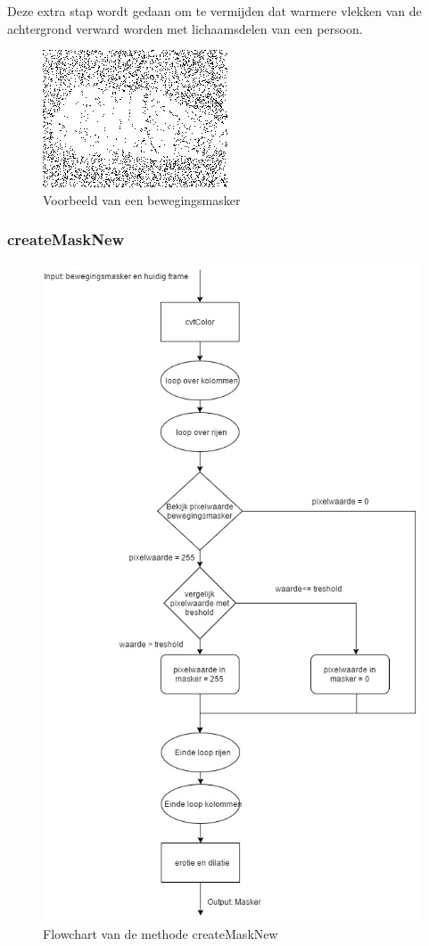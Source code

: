 Deze extra stap wordt gedaan om te vermijden dat warmere vlekken van de achtergrond verward worden met lichaamsdelen van een persoon.
\begin{figure}[hbp]
	\includegraphics[scale=0.75]{bewegingsMatrix}
	\caption{Voorbeeld van een bewegingsmasker}
	\label{imgBMa}
\end{figure}

\subsubsection{createMaskNew}
\begin{figure}[hbp]
	\includegraphics[scale=0.45]{FlowChart_createMaskNew}
	\caption{Flowchart van de methode createMaskNew}
	\label{imgFCCMN}
\end{figure}
